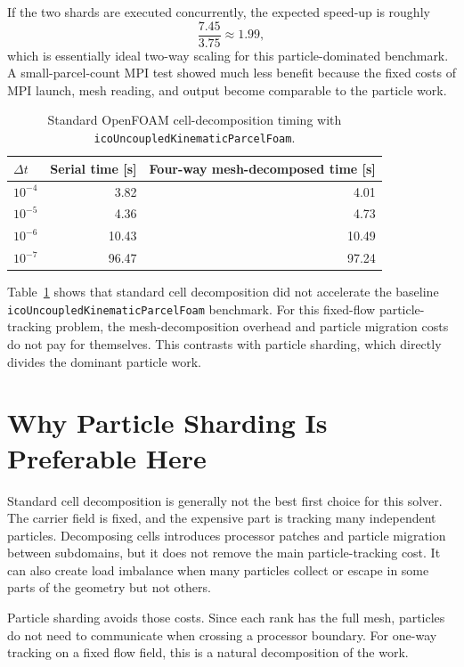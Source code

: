 \documentclass[11pt]{article}
\begin{document}
If the two shards are executed concurrently, the expected speed-up is roughly
\[
    \frac{7.45}{3.75} \approx 1.99,
\]
which is essentially ideal two-way scaling for this particle-dominated
benchmark.  A small-parcel-count MPI test showed much less benefit because the
fixed costs of MPI launch, mesh reading, and output become comparable to the
particle work.

\begin{table}[h]
\centering
\caption{Standard OpenFOAM cell-decomposition timing with \texttt{icoUncoupledKinematicParcelFoam}.}
\label{tab:ico-parallel}
\begin{tabular}{@{}lrr@{}}
\toprule
\(\Delta t\) & Serial time [s] & Four-way mesh-decomposed time [s] \\
\midrule
\(10^{-4}\) & 3.82  & 4.01  \\
\(10^{-5}\) & 4.36  & 4.73  \\
\(10^{-6}\) & 10.43 & 10.49 \\
\(10^{-7}\) & 96.47 & 97.24 \\
\bottomrule
\end{tabular}
\end{table}

Table~\ref{tab:ico-parallel} shows that standard cell decomposition did not
accelerate the baseline \texttt{icoUncoupledKinematicParcelFoam} benchmark.
For this fixed-flow particle-tracking problem, the mesh-decomposition overhead
and particle migration costs do not pay for themselves.  This contrasts with
particle sharding, which directly divides the dominant particle work.

\section{Why Particle Sharding Is Preferable Here}

Standard cell decomposition is generally not the best first choice for this
solver.  The carrier field is fixed, and the expensive part is tracking many
independent particles.  Decomposing cells introduces processor patches and
particle migration between subdomains, but it does not remove the main
particle-tracking cost.  It can also create load imbalance when many particles
collect or escape in some parts of the geometry but not others.

Particle sharding avoids those costs.  Since each rank has the full mesh,
particles do not need to communicate when crossing a processor boundary.  For
one-way tracking on a fixed flow field, this is a natural decomposition of the
work.
\end{document}
